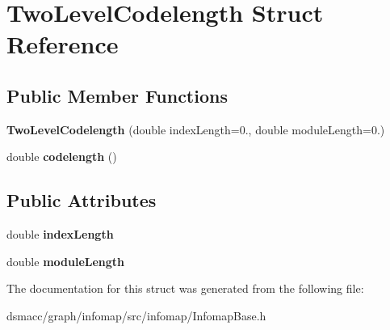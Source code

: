 \hypertarget{structTwoLevelCodelength}{}\section{Two\+Level\+Codelength Struct Reference}
\label{structTwoLevelCodelength}
\subsection*{Public Member Functions}
\begin{DoxyCompactItemize}
\item 
\mbox{\label{structTwoLevelCodelength_a1ad5f528156c4d2fee08b165cc8db757}} 
{\bfseries Two\+Level\+Codelength} (double index\+Length=0., double module\+Length=0.)
\item 
\mbox{\label{structTwoLevelCodelength_a0bc1490f90b3178c1274e09eb8c6452b}} 
double {\bfseries codelength} ()
\end{DoxyCompactItemize}
\subsection*{Public Attributes}
\begin{DoxyCompactItemize}
\item 
\mbox{\label{structTwoLevelCodelength_a9ba534b7f4855c7df39ad5df4889d317}} 
double {\bfseries index\+Length}
\item 
\mbox{\label{structTwoLevelCodelength_aa013597cac4b526254596429a57ff16c}} 
double {\bfseries module\+Length}
\end{DoxyCompactItemize}


The documentation for this struct was generated from the following file\+:\begin{DoxyCompactItemize}
\item 
dsmacc/graph/infomap/src/infomap/Infomap\+Base.\+h\end{DoxyCompactItemize}

